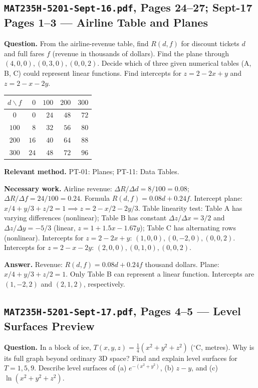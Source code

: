\documentclass[11pt,letterpaper]{article}
\begin{document}
\subsection{\texttt{MAT235H-5201-Sept-16.pdf}, Pages 24--27; Sept-17 Pages 1--3 --- Airline Table and Planes}
\textbf{Question.} From the airline-revenue table, find $R(d,f)$ for discount tickets $d$ and full fares $f$ (revenue in thousands of dollars). Find the plane through $(4,0,0), (0,3,0), (0,0,2)$. Decide which of three given numerical tables (A, B, C) could represent linear functions. Find intercepts for $z = 2 - 2x + y$ and $z = 2 - x - 2y$.
\begin{center}
\small
\begin{tabular}{c|rrrr}
\toprule
$d \backslash f$ & $0$ & $100$ & $200$ & $300$ \\
\midrule
$0$   & $0$  & $24$ & $48$ & $72$ \\
$100$ & $8$  & $32$ & $56$ & $80$ \\
$200$ & $16$ & $40$ & $64$ & $88$ \\
$300$ & $24$ & $48$ & $72$ & $96$ \\
\bottomrule
\end{tabular}
\end{center}

\textbf{Relevant method.} PT-01: Planes; PT-11: Data Tables.

\textbf{Necessary work.}
Airline revenue: $\Delta R / \Delta d = 8/100 = 0.08$; $\Delta R / \Delta f = 24/100 = 0.24$. Formula $R(d,f) = 0.08d + 0.24f$.
Intercept plane: $x/4 + y/3 + z/2 = 1 \implies z = 2 - x/2 - 2y/3$.
Table linearity test: Table A has varying differences (nonlinear); Table B has constant $\Delta z / \Delta x = 3/2$ and $\Delta z / \Delta y = -5/3$ (linear, $z = 1 + 1.5x - 1.67y$); Table C has alternating rows (nonlinear).
Intercepts for $z = 2 - 2x + y$: $(1, 0, 0), (0, -2, 0), (0, 0, 2)$.
Intercepts for $z = 2 - x - 2y$: $(2, 0, 0), (0, 1, 0), (0, 0, 2)$.

\textbf{Answer.}
Revenue: $R(d,f) = 0.08d + 0.24f$ thousand dollars. Plane: $x/4 + y/3 + z/2 = 1$. Only Table B can represent a linear function. Intercepts are $(1,-2,2)$ and $(2,1,2)$, respectively.

\subsection{\texttt{MAT235H-5201-Sept-17.pdf}, Pages 4--5 --- Level Surfaces Preview}
\textbf{Question.} In a block of ice, $T(x,y,z) = \frac{1}{4}(x^2+y^2+z^2)$ ($^\circ\text{C}$, metres). Why is its full graph beyond ordinary 3D space? Find and explain level surfaces for $T = 1, 5, 9$. Describe level surfaces of (a) $e^{-(x^2+y^2)}$, (b) $z - y$, and (c) $\ln(x^2+y^2+z^2)$.
\end{document}
